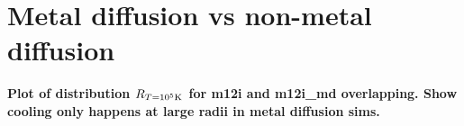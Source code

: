\documentclass[fleqn,usenatbib]{mnras}
\newcommand{\Rcool}{R_{T=10^5 {\rm K}}}
\begin{document}
\section{Metal diffusion vs non-metal diffusion}

\textbf{Plot of distribution $\Rcool$ for m12i and m12i\_md overlapping. Show cooling only happens at large radii in metal diffusion sims.}



\bsp	%
\label{lastpage}
\end{document}
